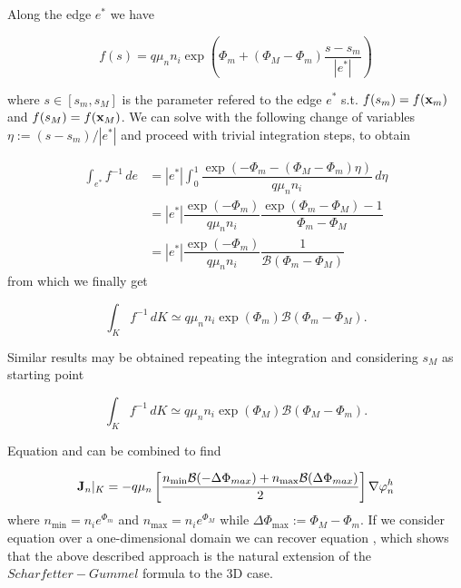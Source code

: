 

Along the edge $e^*$ we have

\begin{equation}
f(s) = q \mu_n n_i \exp\left( \Phi_m + (\Phi_M-\Phi_m)\dfrac{s-s_m}{|e^*|} \right)
\end{equation}

where $s \in [s_m,s_M]$ is the parameter refered to the edge $e^*$ s.t. $f(s_m)=f(\mathbf{x}_m)$ and $f(s_M)=f(\mathbf{x}_M)$. We can solve  with the following change of variables $\eta := (s-s_m)/|e^*|$ and proceed with trivial integration steps, to obtain

\begin{align*}
\int_{e^*} f^{-1} \, de & = |e^*| \int_0^1 \dfrac{\exp \left(-\Phi_m - (\Phi_M-\Phi_m)\eta \right)}{q\mu_n n_i} 
 \, d\eta \\
  & = |e^*|\dfrac{\exp (-\Phi_m)}{q\mu_n n_i} \dfrac{\exp ( \Phi_m-\Phi_M)-1}{\Phi_m-\Phi_M} \\
 & =  |e^*|\dfrac{\exp (-\Phi_m)}{q\mu_n n_i} \dfrac{1}{\mathcal{B}(\Phi_m-\Phi_M)}
\end{align*}
from which we finally get

\begin{equation}
\label{eq: finally approzimation 3D to 1D}
\int_{K} f^{-1} \, dK \simeq  q \mu_n n_i \exp(\Phi_m) \mathcal{B}(\Phi_m-\Phi_M).
\end{equation}

Similar results may be obtained repeating the integration and considering $s_M$ as starting point

\begin{equation}
\label{eq: approssimazione sm}
\int_{K} f^{-1} \, dK \simeq  q \mu_n n_i \exp(\Phi_M) \mathcal{B}(\Phi_M-\Phi_m).
\end{equation}

Equation  and  can be combined to find

\begin{equation}
\label{eq: first formula for J}
\mathbf{J}_n|_K = -  q \mu_n  \left[ \dfrac{ n_{\min} \mathcal{B}(-\Delta \Phi_{max})  + n_{\max}\mathcal{B}(\Delta \Phi_{max})}{2} \right]\nabla \varphi_n^h
\end{equation}
where $n_{\min}=n_i e^{\Phi_m}$ and $n_{\max}=n_i e^{\Phi_M}$ while $\Delta \Phi_{\max} := \Phi_M - \Phi_m$. If we consider equation  over a one-dimensional domain we can recover equation , which shows that the above described approach is the natural extension of the $Scharfetter-Gummel$ formula to the 3D case.



